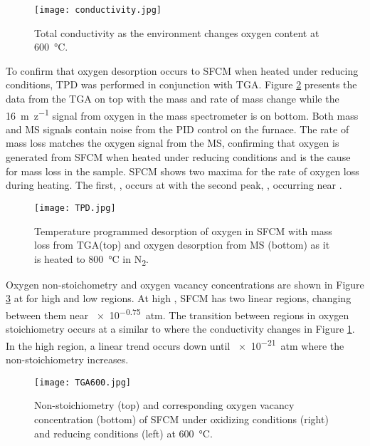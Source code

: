 
    \begin{figure}
      \texttt{[image: conductivity.jpg]}
      \caption{Total conductivity as the environment changes oxygen content at \SI{600}{\celsius}.}
      \label{fig:conductivity}
    \end{figure}

    To confirm that oxygen desorption occurs to SFCM when heated under reducing conditions, TPD was performed in conjunction with TGA.
    Figure \ref{fig:TPD} presents the data from the TGA on top with the mass and rate of mass change while the \SI{16}{m\per z} signal from oxygen in the mass spectrometer is on bottom.
    Both mass and MS signals contain noise from the PID control on the furnace.
    The rate of mass loss matches the oxygen signal from the MS, confirming that oxygen is generated from SFCM when heated under reducing conditions and is the cause for mass loss in the sample.
    SFCM shows two maxima for the rate of oxygen loss during heating.
    The first, \textalpha, occurs at  with the second peak, \textbeta, occurring near .


    \begin{figure}
      \texttt{[image: TPD.jpg]}
      \caption{Temperature programmed desorption of oxygen in SFCM with mass loss from TGA(top) and oxygen desorption from MS (bottom) as it is heated to \SI{800}{\celsius} in N\textsubscript{2}.}
      \label{fig:TPD}
    \end{figure}

    Oxygen non-stoichometry and oxygen vacancy concentrations are shown in Figure \ref{fig:TGA600} at  for high and low  regions.
    At high , SFCM has two linear regions, changing between them near \SI{e-0.75}{atm}.
    The transition between regions in oxygen stoichiometry occurs at a similar   to where the conductivity changes in Figure \ref{fig:conductivity}.
    In the high  region, a linear trend occurs down until \SI{e-21}{atm} where the non-stoichiometry increases.

    \begin{figure}
      \texttt{[image: TGA600.jpg]}
      \caption{Non-stoichiometry (top) and corresponding oxygen vacancy concentration (bottom) of SFCM under oxidizing conditions (right) and reducing conditions (left) at \SI{600}{\celsius}.}
      \label{fig:TGA600}
    \end{figure}

